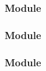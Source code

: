 \documentclass[t, notes, xcolor=table]{beamer}
\begin{document}
\begin{frame}
\frametitle{Module}

\end{frame}

\begin{frame}
\frametitle{Module}

\end{frame}

\begin{frame}
\frametitle{Module}

\end{frame}
\end{document}
